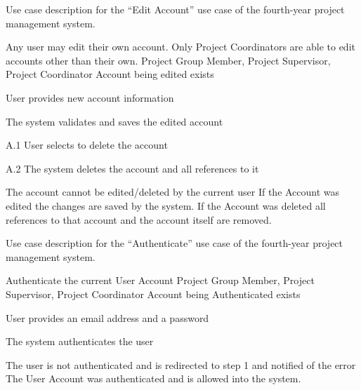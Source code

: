 \documentclass[document.tex]{subfiles}
\begin{document}
\begin{table}[!htbp]
  \centering
  \caption{Use case description for the ``Edit Account'' use case of the fourth-year project management system.}
  \label{tbl:use-case-manage-account}

  \begin{usecase}
    Any user may edit their own account. Only Project Coordinators are able to edit accounts other than their own.
    Project Group Member, Project Supervisor, Project Coordinator
    Account being edited exists
    \ucnormal
    \begin{ucenum}
      \item User provides new account information
      \item The system validates and saves the edited account
    \end{ucenum}
    \begin{ucenum}
      \item [A.1] User selects to delete the account
      \item [A.2] The system deletes the account and all references to it
    \end{ucenum}
    The account cannot be edited\slash deleted by the current user
    If the Account was edited the changes are saved by the system. If the Account was deleted all references to that account and the account itself are removed.
  \end{usecase}
\end{table}


\begin{table}[!htbp]
  \centering
  \caption{Use case description for the ``Authenticate'' use case of the fourth-year project management system.}
  \label{tbl:use-case-authenticate}

  \begin{usecase}[Authenticate]
    Authenticate the current User Account
    Project Group Member, Project Supervisor, Project Coordinator
    Account being Authenticated exists
    \ucnormal
    \begin{ucenum}
      \item User provides an email address and a password
      \item The system authenticates the user
    \end{ucenum}
    The user is not authenticated and is redirected to step 1 and notified of the error
    The User Account was authenticated and is allowed into the system.
  \end{usecase}
\end{table}
\end{document}
